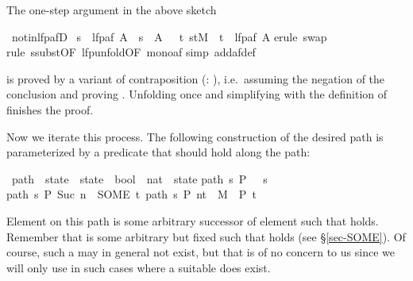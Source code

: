 \begin{isabellebody}
\begin{isamarkuptext}
The one-step argument in the above sketch%
\end{isamarkuptext}%
\ not{\isacharunderscore}in{\isacharunderscore}lfp{\isacharunderscore}afD{\isacharcolon}\isanewline
\ {\isachardoublequote}s\ {\isasymnotin}\ lfp{\isacharparenleft}af\ A{\isacharparenright}\ {\isasymLongrightarrow}\ s\ {\isasymnotin}\ A\ {\isasymand}\ {\isacharparenleft}{\isasymexists}\ t{\isachardot}\ {\isacharparenleft}s{\isacharcomma}t{\isacharparenright}{\isasymin}M\ {\isasymand}\ t\ {\isasymnotin}\ lfp{\isacharparenleft}af\ A{\isacharparenright}{\isacharparenright}{\isachardoublequote}\isanewline
{}erule\ swap{\isacharparenright}\isanewline
{}rule\ ssubst{\isacharbrackleft}OF\ lfp{\isacharunderscore}unfold{\isacharbrackleft}OF\ mono{\isacharunderscore}af{\isacharbrackright}{\isacharbrackright}{\isacharparenright}\isanewline
{}simp\ add{\isacharcolon}af{\isacharunderscore}def{\isacharparenright}\isanewline
{}%
\begin{isamarkuptext}%
\noindent
is proved by a variant of contraposition (:
), i.e.\ assuming the negation of the conclusion
and proving . Unfolding  once and
simplifying with the definition of  finishes the proof.

Now we iterate this process. The following construction of the desired
path is parameterized by a predicate  that should hold along the path:%
\end{isamarkuptext}%
\ path\ {\isacharcolon}{\isacharcolon}\ {\isachardoublequote}state\ {\isasymRightarrow}\ {\isacharparenleft}state\ {\isasymRightarrow}\ bool{\isacharparenright}\ {\isasymRightarrow}\ {\isacharparenleft}nat\ {\isasymRightarrow}\ state{\isacharparenright}{\isachardoublequote}\isanewline
{}\isanewline
{\isachardoublequote}path\ s\ P\ {}\ {\isacharequal}\ s{\isachardoublequote}\isanewline
{\isachardoublequote}path\ s\ P\ {\isacharparenleft}Suc\ n{\isacharparenright}\ {\isacharequal}\ {\isacharparenleft}SOME\ t{\isachardot}\ {\isacharparenleft}path\ s\ P\ n{\isacharcomma}t{\isacharparenright}\ {\isasymin}\ M\ {\isasymand}\ P\ t{\isacharparenright}{\isachardoublequote}%
\begin{isamarkuptext}%
\noindent
Element  on this path is some arbitrary successor
 of element  such that  holds.  Remember that 
is some arbitrary but fixed  such that  holds (see \S\ref{sec-SOME}). Of
course, such a  may in general not exist, but that is of no
concern to us since we will only use  in such cases where a
suitable  does exist.


\end{isamarkuptext}
\end{isabellebody}
